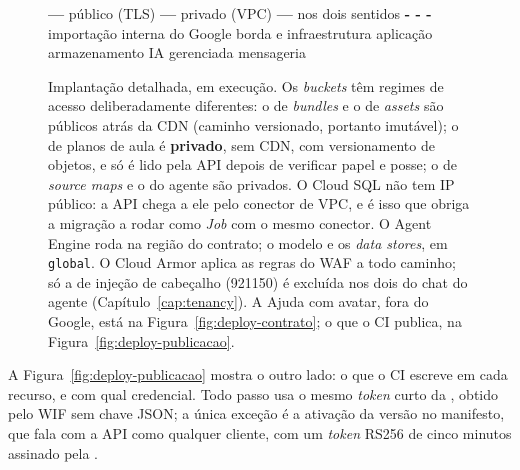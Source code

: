 \begin{figure}[H]
{\begin{tikzpicture}
\end{tikzpicture}}
\begin{legendadiag}
\textcolor{unooOrange}{\textbf{---}} público (TLS) \quad
\textcolor{unooGreen!70!black}{\textbf{---}} privado (VPC) \quad
\textcolor{unooInkSoft}{\textbf{---}} nos dois sentidos \quad
\textcolor{unooInkSoft}{\textbf{- - -}} importação interna do Google \quad
{} borda e infraestrutura \quad
{} aplicação \quad
{} armazenamento \quad
{} IA gerenciada \quad
{} mensageria
\end{legendadiag}
\caption[Implantação detalhada --- o caminho da requisição]{Implantação
  detalhada, em execução. Os \emph{buckets} têm regimes de acesso
  deliberadamente diferentes: o de \emph{bundles} e o de \emph{assets} são
  públicos atrás da CDN (caminho versionado, portanto imutável); o de planos de
  aula é \textbf{privado}, sem CDN, com versionamento de objetos, e só é lido
  pela API depois de verificar papel e posse; o de \emph{source maps} e o do
  agente são privados. O Cloud SQL não tem IP público: a API chega a ele pelo
  conector de VPC, e é isso que obriga a migração a rodar como \emph{Job} com o
  mesmo conector. O Agent Engine roda na região do contrato; o modelo e os
  \emph{data stores}, em \texttt{global}. O Cloud Armor aplica as regras do WAF a
  todo caminho; só a de injeção de cabeçalho (921150) é excluída nos dois do
  chat do agente (Capítulo~\ref{cap:tenancy}). A
  Ajuda com avatar, fora do Google, está na Figura~\ref{fig:deploy-contrato}; o
  que o CI publica, na Figura~\ref{fig:deploy-publicacao}.}
\label{fig:deploy-detalhe}
\end{figure}
A Figura~\ref{fig:deploy-publicacao} mostra o outro lado: o que o CI escreve em
cada recurso, e com qual credencial. Todo passo usa o mesmo \emph{token} curto da
, obtido pelo WIF sem chave JSON; a única exceção é a ativação da
versão no manifesto, que fala com a API como qualquer cliente, com um
\emph{token} RS256 de cinco minutos assinado pela
.

